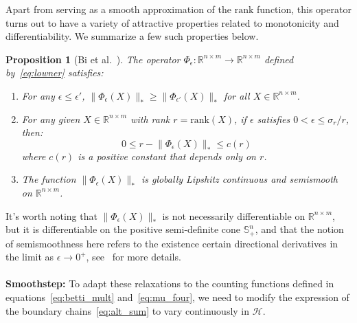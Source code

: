 \documentclass[10pt]{article}
\numberwithin{equation}{section}
\newcommand{\+}{%
	\raisebox{0.18ex}{\scaleobj{0.55}{+}}
}
\newtheorem{proposition}{Proposition}
\theoremstyle{definition}
\begin{document}
\noindent Apart from serving as a smooth approximation of the $\mathrm{rank}$ function, this operator turns out to have a variety of attractive properties related to monotonicity and differentiability.
We summarize a few such properties below. 
\begin{proposition}[Bi et al.~\cite{bi2013approximation}] The operator $\Phi_\epsilon: \mathbb{R}^{n \times m} \to \mathbb{R}^{n \times m}$ defined by~\eqref{eq:lowner} satisfies: 
	\begin{enumerate}
		\item For any $\epsilon \leq \epsilon'$, $\lVert \Phi_{\epsilon}(X) \rVert_\ast \geq \lVert \Phi_{\epsilon'}(X) \rVert_\ast$ for all $X \in \mathbb{R}^{n \times m}$.
		\item For any given $X \in \mathbb{R}^{n \times m}$ with rank $r = \mathrm{rank}(X)$, if $\epsilon$ satisfies $0 < \epsilon \leq \sigma_r / r$, then: 
		$$ 0 \leq r - \lVert \Phi_\epsilon(X) \rVert_\ast \leq c(r) $$
		where $c(r)$ is a positive constant that depends only on $r$. 
		\item The function $\lVert \Phi_\epsilon(X) \rVert_\ast$ is globally Lipshitz continuous and semismooth on $\mathbb{R}^{n \times m}$.
	\end{enumerate}
\end{proposition}
\noindent It's worth noting that $\lVert\Phi_\epsilon(X)\rVert_\ast$ is not necessarily differentiable on $\mathbb{R}^{n \times m}$, but it is differentiable on the positive semi-definite cone $\mathbb{S}^n_+$, and that the notion of semismoothness here refers to the existence certain directional derivatives in the limit as $\epsilon \to 0^+$, see~\cite{} for more details. 
\\
\\
\noindent \textbf{Smoothstep:} To adapt these relaxations to the counting functions defined in equations~\eqref{eq:betti_mult} and~\eqref{eq:mu_four}, we need to modify the expression of the boundary chains~\eqref{eq:alt_sum} to vary continuously in $\mathcal{H}$. 
\end{document}
